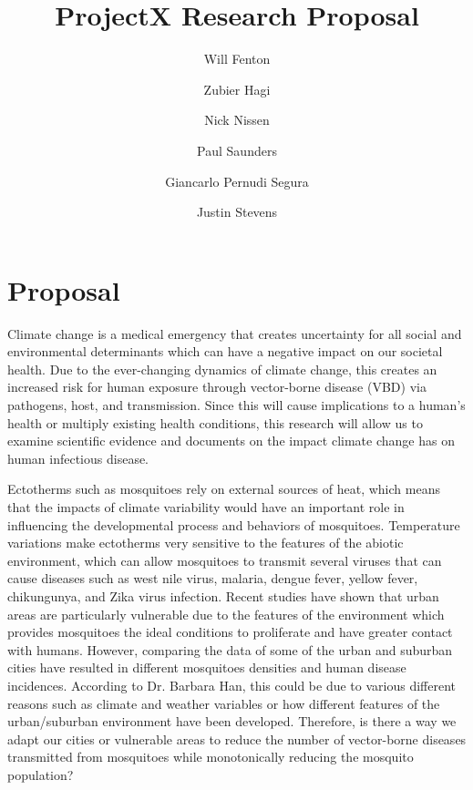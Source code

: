 \documentclass[11pt]{article}
\title{ProjectX Research Proposal}
\author{Will Fenton}
\author{Zubier Hagi}
\author{Nick Nissen}
\author{Paul Saunders}
\author{Giancarlo Pernudi Segura}
\author{Justin Stevens}
\affil{University of Alberta}
\begin{document}
\maketitle

\section{Proposal}
Climate change is a medical emergency that creates uncertainty for all social and environmental determinants which can have a negative impact on our societal health. Due to the ever-changing dynamics of climate change, this creates an increased risk for human exposure through vector-borne disease (VBD) via pathogens, host, and transmission. Since this will cause implications to a human's health or multiply existing health conditions, this research will allow us to examine scientific evidence and documents on the impact climate change has on human infectious disease. 

Ectotherms such as mosquitoes rely on external sources of heat, which means that the impacts of climate variability would have an important role in influencing the developmental process and behaviors of mosquitoes. Temperature variations make ectotherms very sensitive to the features of the abiotic environment, which can allow mosquitoes to transmit several viruses that can cause diseases such as west nile virus, malaria, dengue fever, yellow fever, chikungunya, and Zika virus infection. Recent studies have shown that urban areas are particularly vulnerable due to the features of the environment which provides mosquitoes the ideal conditions to proliferate and have greater contact with humans. However, comparing the data of some of the urban and suburban cities have resulted in different mosquitoes densities and human disease incidences. According to Dr. Barbara Han, this could be due to various different reasons such as climate and weather variables or how different features of the urban/suburban environment have been developed. Therefore, is there a way we adapt our cities or vulnerable areas to reduce the number of vector-borne diseases transmitted from mosquitoes while monotonically reducing the mosquito population?
\end{document}
